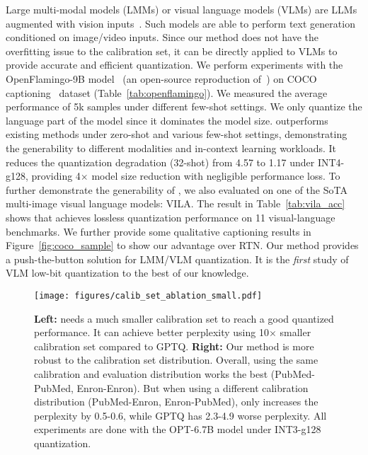  Large multi-modal models (LMMs) or visual language models (VLMs) are LLMs augmented with vision inputs~\cite{alayrac2022flamingo,li2023blip,koh2023grounding,driess2023palm,zhang2023llama,liu2023llava}. Such models are able to perform text generation conditioned on image/video inputs. Since our method does not have the overfitting issue to the calibration set, it can be directly applied to VLMs to provide accurate and efficient quantization. 
We perform experiments with the OpenFlamingo-9B model~\cite{openflamingo} (an open-source reproduction of~\cite{alayrac2022flamingo}) on COCO captioning~\cite{chen2015microsoft} dataset (Table~\ref{tab:openflamingo}). We measured the average performance of 5k samples under different few-shot settings. We only quantize the language part of the model since it dominates the model size. 
\methodshort outperforms existing methods under zero-shot and various few-shot settings, demonstrating the generability to different modalities and in-context learning workloads. It reduces the quantization degradation (32-shot) from 4.57 to 1.17 under INT4-g128, providing 4$\times$ model size reduction with negligible performance loss. 
To further demonstrate the generability of \methodshort, we also evaluated \methodshort on one of the SoTA multi-image visual language models: VILA. The result in Table~\ref{tab:vila_acc} shows that \methodshort achieves lossless quantization performance on 11 visual-language benchmarks.
We further provide some qualitative captioning results in Figure~\ref{fig:coco_sample} to show our advantage over RTN.  
Our method provides a push-the-button solution for LMM/VLM quantization. It is the \emph{first} study of VLM low-bit quantization to the best of our knowledge.

\begin{figure*}
    \centering
     \texttt{[image: figures/calib\_set\_ablation\_small.pdf]}
    \caption{\textbf{Left:} \methodshort needs a much smaller calibration set to reach a good quantized performance. It can achieve better perplexity using 10$\times$ smaller calibration set compared to GPTQ. \textbf{Right:} Our method is more robust to the calibration set distribution. Overall, using the same calibration and evaluation distribution works the best (PubMed-PubMed, Enron-Enron). But when using a different calibration distribution (PubMed-Enron, Enron-PubMed), \methodshort only increases the perplexity by 0.5-0.6, while GPTQ has 2.3-4.9 worse perplexity. All experiments are done with the OPT-6.7B model under INT3-g128 quantization.}
    \label{fig:calib_set_ablation}
\end{figure*}

